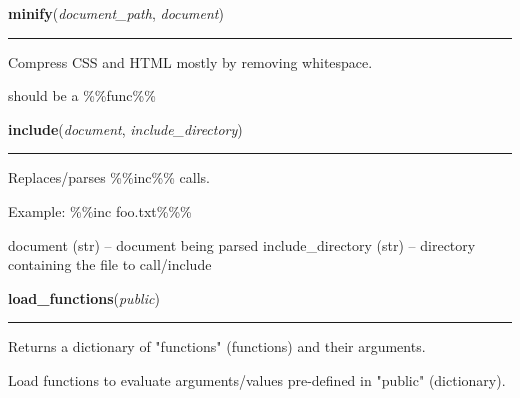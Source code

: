     \label{sakura:minify}

    \vspace{0.5ex}

\hspace{.8\funcindent}\begin{boxedminipage}{\funcwidth}

    \raggedright \textbf{minify}(\textit{document\_path}, \textit{document})

    \vspace{-1.5ex}

    \rule{\textwidth}{0.5\fboxrule}
\setlength{\parskip}{2ex}
    Compress CSS and HTML mostly by removing whitespace.

    should be a \%\%func\%\%

\setlength{\parskip}{1ex}
    \end{boxedminipage}

    \label{sakura:include}

    \vspace{0.5ex}

\hspace{.8\funcindent}\begin{boxedminipage}{\funcwidth}

    \raggedright \textbf{include}(\textit{document}, \textit{include\_directory})

    \vspace{-1.5ex}

    \rule{\textwidth}{0.5\fboxrule}
\setlength{\parskip}{2ex}
    Replaces/parses \%\%inc\%\% calls.

    Example: \%\%inc foo.txt\%\%\%

    document (str) -- document being parsed include\_directory (str) -- 
    directory containing the file to call/include

\setlength{\parskip}{1ex}
    \end{boxedminipage}

    \label{sakura:load_functions}

    \vspace{0.5ex}

\hspace{.8\funcindent}\begin{boxedminipage}{\funcwidth}

    \raggedright \textbf{load\_functions}(\textit{public})

    \vspace{-1.5ex}

    \rule{\textwidth}{0.5\fboxrule}
\setlength{\parskip}{2ex}
    Returns a dictionary of "functions" (functions) and their arguments.

    Load functions to evaluate arguments/values pre-defined in "public" 
    (dictionary).

\setlength{\parskip}{1ex}
    \end{boxedminipage}

